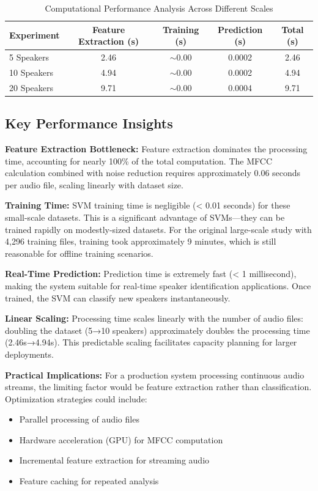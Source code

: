 \documentclass[11pt,twoside,openany]{book}
\begin{document}
\begin{table}[h!]
    \centering
    \begin{tabular}{|l|c|c|c|c|}
        \hline
        \textbf{Experiment} & \textbf{Feature Extraction (s)} & \textbf{Training (s)} & \textbf{Prediction (s)} & \textbf{Total (s)}\\ \hline
        5 Speakers & 2.46 & $\sim$0.00 & 0.0002 & 2.46\\ \hline
        10 Speakers & 4.94 & $\sim$0.00 & 0.0002 & 4.94\\ \hline
        20 Speakers & 9.71 & $\sim$0.00 & 0.0004 & 9.71\\ \hline
    \end{tabular}
    \caption{Computational Performance Analysis Across Different Scales}
    \label{tab:timing_analysis}
\end{table}

\subsection{Key Performance Insights}

\textbf{Feature Extraction Bottleneck:} Feature extraction dominates the processing time, accounting for nearly 100\% of the total computation. The MFCC calculation combined with noise reduction requires approximately 0.06 seconds per audio file, scaling linearly with dataset size.

\textbf{Training Time:} SVM training time is negligible (< 0.01 seconds) for these small-scale datasets. This is a significant advantage of SVMs—they can be trained rapidly on modestly-sized datasets. For the original large-scale study with 4,296 training files, training took approximately 9 minutes, which is still reasonable for offline training scenarios.

\textbf{Real-Time Prediction:} Prediction time is extremely fast (< 1 millisecond), making the system suitable for real-time speaker identification applications. Once trained, the SVM can classify new speakers instantaneously.

\textbf{Linear Scaling:} Processing time scales linearly with the number of audio files: doubling the dataset (5→10 speakers) approximately doubles the processing time (2.46s→4.94s). This predictable scaling facilitates capacity planning for larger deployments.

\textbf{Practical Implications:} For a production system processing continuous audio streams, the limiting factor would be feature extraction rather than classification. Optimization strategies could include:
\begin{itemize}[itemsep=1pt]
\item Parallel processing of audio files
\item Hardware acceleration (GPU) for MFCC computation
\item Incremental feature extraction for streaming audio
\item Feature caching for repeated analysis
\end{itemize}
\end{document}
